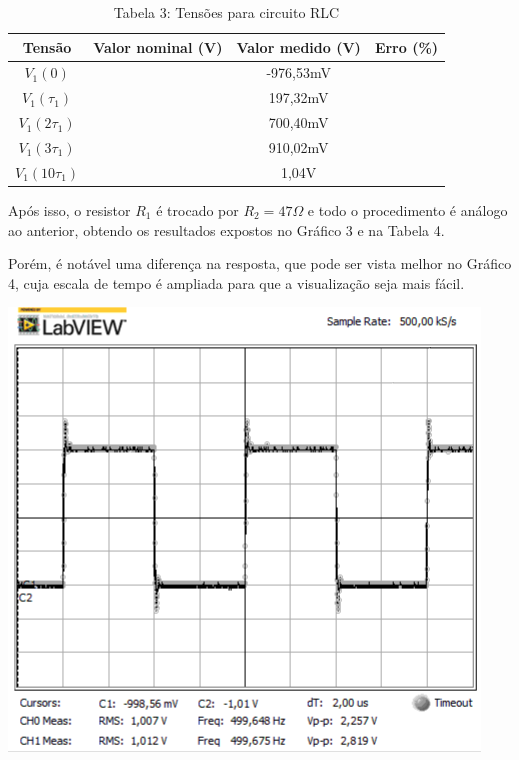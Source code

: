 \documentclass[a4 paper]{article}
\begin{document}
\vspace{5pt}
\begin{table}[h]
\centering
\begin{tabular}{|c|c|c|c|}
\hline
Tensão & Valor nominal (V) & Valor medido (V) & Erro (\%) \\\hline
$V_1(0)$ &  & -976,53mV & \\    \hline
$V_1(\tau_1)$ &  & 197,32mV & \\    \hline
$V_1(2\tau_1)$ &  & 700,40mV & \\\hline
$V_1(3\tau_1)$ &  & 910,02mV & \\\hline
$V_1(10\tau_1)$ &  & 1,04V & \\\hline
\end{tabular}
\caption*{Tabela 3: Tensões para circuito RLC}
\end{table}


\newpage
Após isso, o resistor $R_1$ é trocado por $R_2=47\Omega$ e todo o procedimento é análogo ao anterior, obtendo os resultados expostos no Gráfico 3 e na Tabela 4.


Porém, é notável uma diferença na resposta, que pode ser vista melhor no Gráfico 4, cuja escala de tempo é ampliada para que a visualização seja mais fácil.


\begin{table}[h]
\centering
\includegraphics[scale=0.6]{rgadicoas/rgadicoa3}
\end{table}
\end{document}
